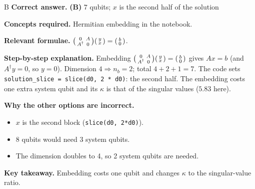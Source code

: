 \documentclass[11pt,a4paper]{article}
\newcommand{\qsep}{\par\vspace{2pt}{\color{black!15}\hrule}\vspace{4pt}}
\begin{document}
\begin{solbox}{B}
\textbf{\color{brand}Correct answer.} \textcolor{okgreen}{\textbf{(B)}} $7$ qubits; $x$ is the second half of the solution

\textbf{\color{brand}Concepts required.} Hermitian embedding in the notebook.

\textbf{\color{brand}Relevant formulae.} $\begin{psmallmatrix}0&A\\A^\dagger&0\end{psmallmatrix}\begin{psmallmatrix}y\\x\end{psmallmatrix} = \begin{psmallmatrix}b\\0\end{psmallmatrix}$.

\textbf{\color{brand}Step-by-step explanation.} Embedding $\begin{psmallmatrix}0 & A\\ A^\dagger & 0\end{psmallmatrix}\begin{psmallmatrix}y\\ x\end{psmallmatrix} = \begin{psmallmatrix}b\\ 0\end{psmallmatrix}$ gives $Ax = b$ (and $A^\dagger y = 0$, so $y = 0$). Dimension $4 \Rightarrow n_b = 2$; total $4 + 2 + 1 = 7$. The code sets
\texttt{solution\_slice = slice(d0, 2 * d0)}: the second half. The embedding costs one extra system qubit and its $\kappa$ is that of the singular values ($5.83$ here).

\textbf{\color{brand}Why the other options are incorrect.}
\begin{itemize}[leftmargin=2.4em, itemsep=1pt, topsep=2pt]
\item[\textbf{(A)}] $x$ is the second block (\texttt{slice(d0, 2*d0)}).
\item[\textbf{(C)}] $8$ qubits would need 3 system qubits.
\item[\textbf{(D)}] The dimension doubles to 4, so 2 system qubits are needed.
\end{itemize}
\textbf{\color{brand}Key takeaway.} Embedding costs one qubit and changes $\kappa$ to the singular-value ratio.
\end{solbox}
\qsep
\end{document}
